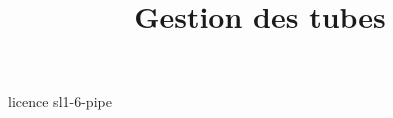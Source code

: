 \documentclass {beamer}
\title {Gestion des tubes}
\begin{document}
 {licence}
 {sl1-6-pipe}
\end{document}
